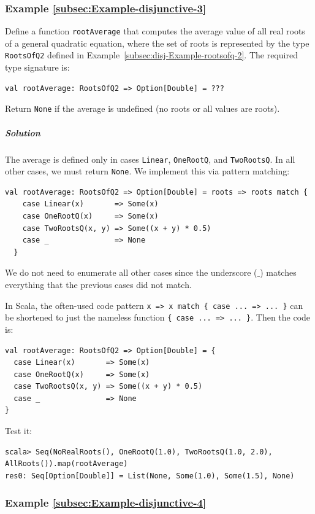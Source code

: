 \subsubsection{Example \label{subsec:Example-disjunctive-3}\ref{subsec:Example-disjunctive-3}}

Define a function \lstinline!rootAverage! that computes the average
value of all real roots of a general quadratic equation, where the
set of roots is represented by the type \lstinline!RootsOfQ2! defined
in Example~\ref{subsec:disj-Example-rootsofq-2}. The required type
signature is:
\begin{lstlisting}
val rootAverage: RootsOfQ2 => Option[Double] = ???
\end{lstlisting}
Return \lstinline!None! if the average is undefined (no roots or
all values are roots).

\subparagraph{Solution}

The average is defined only in cases \lstinline!Linear!, \lstinline!OneRootQ!,
and \lstinline!TwoRootsQ!. In all other cases, we must return \lstinline!None!.
We implement this via pattern matching:
\begin{lstlisting}
val rootAverage: RootsOfQ2 => Option[Double] = roots => roots match {
    case Linear(x)       => Some(x)
    case OneRootQ(x)     => Some(x)
    case TwoRootsQ(x, y) => Some((x + y) * 0.5)
    case _               => None
  }
\end{lstlisting}
We do not need to enumerate all other cases since the underscore ($\_$)
matches everything that the previous cases did not match.

In Scala, the often-used code pattern \lstinline!x => x match { case ... => ... }!
can be shortened to just the nameless function \lstinline!{ case ... => ... }!.
Then the code is:
\begin{lstlisting}
val rootAverage: RootsOfQ2 => Option[Double] = {
  case Linear(x)       => Some(x)
  case OneRootQ(x)     => Some(x)
  case TwoRootsQ(x, y) => Some((x + y) * 0.5)
  case _               => None
}
\end{lstlisting}
Test it:
\begin{lstlisting}
scala> Seq(NoRealRoots(), OneRootQ(1.0), TwoRootsQ(1.0, 2.0), AllRoots()).map(rootAverage)
res0: Seq[Option[Double]] = List(None, Some(1.0), Some(1.5), None)
\end{lstlisting}


\subsubsection{Example \label{subsec:Example-disjunctive-4}\ref{subsec:Example-disjunctive-4}}

